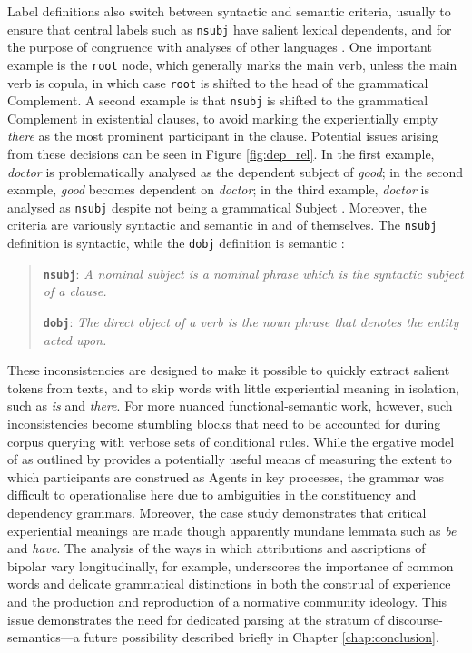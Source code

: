 Label definitions also switch between syntactic and semantic criteria, usually to ensure that central labels such as \texttt{nsubj} have salient lexical dependents, and for the purpose of congruence with analyses of other languages \cite{marneffe_ud_2014}. One important example is the \texttt{root} node, which generally marks the main verb, unless the main verb is copula, in which case \texttt{root} is shifted to the head of the grammatical Complement. A second example is that \texttt{nsubj} is shifted to the grammatical Complement in existential clauses, to avoid marking the experientially empty \emph{there} \cite{halliday_introduction_2004} as the most prominent participant in the clause. Potential issues arising from these decisions can be seen in Figure \ref{fig:dep_rel}. In the first example, \emph{doctor} is problematically analysed as the dependent subject of \emph{good}; in the second example, \emph{good} becomes dependent on \emph{doctor}; in the third example, \emph{doctor} is analysed as \texttt{nsubj} despite not being a grammatical Subject \cite{marneffe_ud_2014}. Moreover, the criteria are variously syntactic and semantic in and of themselves. The \texttt{nsubj} definition is syntactic, while the \texttt{dobj} definition is semantic \cite[see][]{nivre_towards_2015}:

\begin{quotation}\small \singlespacing
\textbf{\texttt{nsubj}}: \emph{A nominal subject is a nominal phrase which is the syntactic subject of a clause.}

\textbf{\texttt{dobj}}: \emph{The direct object of a verb is the noun phrase that denotes the entity acted upon.}
\end{quotation}
%
These inconsistencies are designed to make it possible to quickly extract salient tokens from texts, and to skip words with little experiential meaning in isolation, such as \emph{is} and \emph{there}. For more nuanced functional\hyp{}semantic work, however, such inconsistencies become stumbling blocks that need to be accounted for during \gls{corpus} querying with verbose sets of conditional rules. While the ergative model of  as outlined by \textcite{halliday_introduction_2004} provides a potentially useful means of measuring the extent to which participants are construed as Agents in key processes, the grammar was difficult to operationalise here due to ambiguities in the constituency and dependency grammars. Moreover, the case study demonstrates that critical experiential meanings are made though apparently mundane lemmata such as \emph{be} and \emph{have}. The analysis of the ways in which attributions and ascriptions of \gls{bipolar} vary longitudinally, for example, underscores the importance of common words and delicate grammatical distinctions in both the construal of experience and the production and reproduction of a normative community ideology. This issue demonstrates the need for dedicated parsing at the stratum of \glspl{discourse-semantic}---a future possibility described briefly in Chapter \ref{chap:conclusion}.

